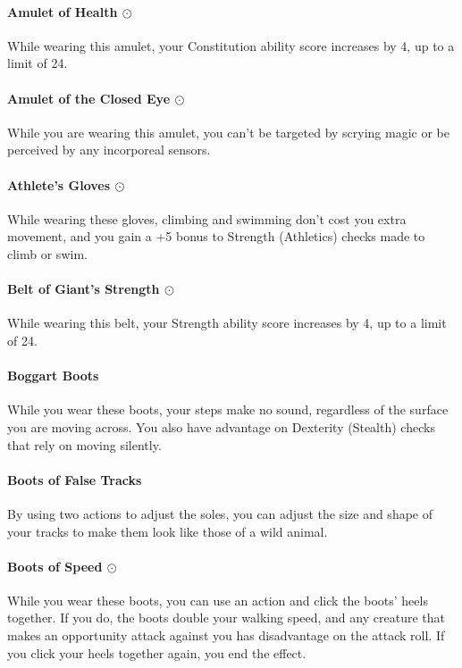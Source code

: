     \paragraph{Amulet of Health $\odot$}
        While wearing this amulet, your Constitution ability score increases by 4, up to a limit of 24.
    \paragraph{Amulet of the Closed Eye $\odot$}
        While you are wearing this amulet, you can't be targeted by scrying magic or be perceived by any incorporeal sensors.
    \paragraph{Athlete's Gloves $\odot$}
        While wearing these gloves, climbing and swimming don't cost you extra movement, and you gain a +5 bonus to Strength (Athletics) checks made to climb or swim.
    \paragraph{Belt of Giant's Strength $\odot$}
        While wearing this belt, your Strength ability score increases by 4, up to a limit of 24.
    \paragraph{Boggart Boots}
        While you wear these boots, your steps make no sound, regardless of the surface you are moving across. You also have advantage on Dexterity (Stealth) checks that rely on moving silently.
    \paragraph{Boots of False Tracks}
        By using two actions to adjust the soles, you can adjust the size and shape of your tracks to make them look like those of a wild animal.
    \paragraph{Boots of Speed $\odot$}
        While you wear these boots, you can use an action and click the boots' heels together.
        If you do, the boots double your walking speed, and any creature that makes an opportunity attack against you has disadvantage on the attack roll.
        If you click your heels together again, you end the effect.

